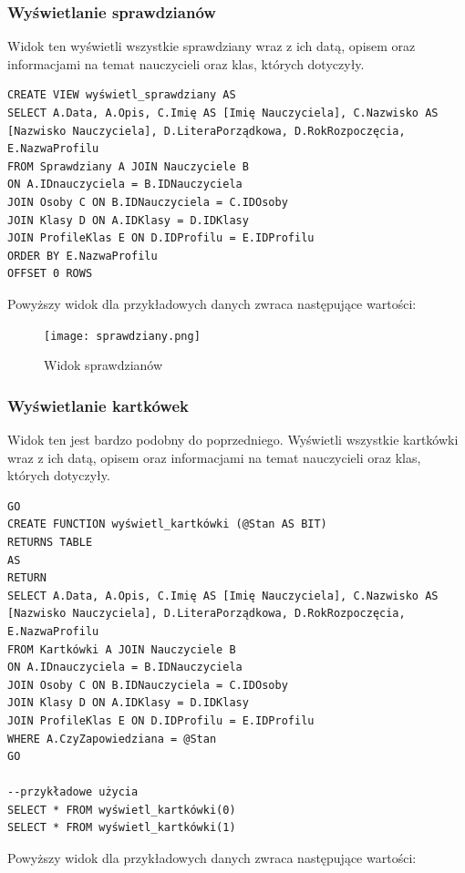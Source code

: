 \documentclass[60pt]{article}
\begin{document}
\subsubsection{Wyświetlanie sprawdzianów}

Widok ten wyświetli wszystkie sprawdziany wraz z ich datą, opisem oraz informacjami na temat nauczycieli oraz klas, których dotyczyły.

\begin{verbatim}
CREATE VIEW wyświetl_sprawdziany AS
SELECT A.Data, A.Opis, C.Imię AS [Imię Nauczyciela], C.Nazwisko AS [Nazwisko Nauczyciela], D.LiteraPorządkowa, D.RokRozpoczęcia, E.NazwaProfilu
FROM Sprawdziany A JOIN Nauczyciele B
ON A.IDnauczyciela = B.IDNauczyciela
JOIN Osoby C ON B.IDNauczyciela = C.IDOsoby
JOIN Klasy D ON A.IDKlasy = D.IDKlasy
JOIN ProfileKlas E ON D.IDProfilu = E.IDProfilu
ORDER BY E.NazwaProfilu
OFFSET 0 ROWS
\end{verbatim}

Powyższy widok dla przykładowych danych zwraca następujące wartości:

\begin{figure}[h]
  \texttt{[image: sprawdziany.png]}
  \caption{Widok sprawdzianów}
  \label{Widok sprawdzianów}
\end{figure}

\subsubsection{Wyświetlanie kartkówek}

Widok ten jest bardzo podobny do poprzedniego. Wyświetli wszystkie kartkówki wraz z ich datą, opisem oraz informacjami na temat nauczycieli oraz klas, których dotyczyły.

\begin{verbatim}
GO
CREATE FUNCTION wyświetl_kartkówki (@Stan AS BIT)
RETURNS TABLE
AS
RETURN
SELECT A.Data, A.Opis, C.Imię AS [Imię Nauczyciela], C.Nazwisko AS [Nazwisko Nauczyciela], D.LiteraPorządkowa, D.RokRozpoczęcia, E.NazwaProfilu
FROM Kartkówki A JOIN Nauczyciele B
ON A.IDnauczyciela = B.IDNauczyciela
JOIN Osoby C ON B.IDNauczyciela = C.IDOsoby
JOIN Klasy D ON A.IDKlasy = D.IDKlasy
JOIN ProfileKlas E ON D.IDProfilu = E.IDProfilu
WHERE A.CzyZapowiedziana = @Stan
GO

--przykładowe użycia
SELECT * FROM wyświetl_kartkówki(0)
SELECT * FROM wyświetl_kartkówki(1)
\end{verbatim}

Powyższy widok dla przykładowych danych zwraca następujące wartości:
\end{document}
